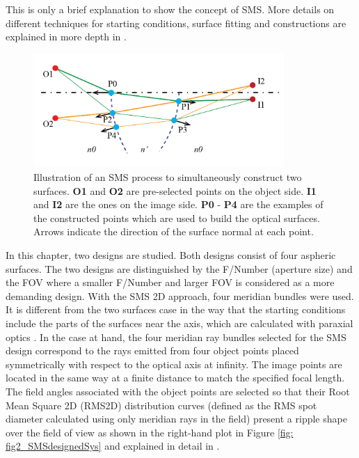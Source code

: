 This is only a brief explanation to show the concept of SMS. More details on different techniques for starting conditions, surface fitting and constructions are explained in more depth in \cite{book:ChavesNonimagingOptics}.

\begin{figure}[h!]
    \centering
    \includegraphics[width=0.85\textwidth]{chapter-5/figures/Figure_sms_explain_2D.png}
    \caption{Illustration of an SMS process to simultaneously construct two surfaces. \textbf{O1} and \textbf{O2} are pre-selected points on the object side. \textbf{I1} and \textbf{I2} are the ones on the image side. \textbf{P0} - \textbf{P4} are the examples of the constructed points which are used to build the optical surfaces. Arrows indicate the direction of the surface normal at each point. }
    \label{fig: sms_2d_explain}
\end{figure}

In this chapter, two designs are studied. Both designs consist of four aspheric surfaces. The two designs are distinguished by the F/Number (aperture size) and the FOV where a smaller F/Number and larger FOV is considered as a more demanding design. With the SMS 2D approach, four meridian bundles were used. It is different from the two surfaces case in the way that the starting conditions include the parts of the surfaces near the axis, which are calculated with paraxial optics \cite{MinanoOE09}. In the case at hand, the four meridian ray bundles selected for the SMS design correspond to the rays emitted from four object points placed symmetrically with respect to the optical axis at infinity. The image points are located in the same way at a finite distance to match the specified focal length. The field angles associated with the object points are selected so that their Root Mean Square 2D (RMS2D) distribution curves (defined as the RMS spot diameter calculated using only meridian rays in the field) present a ripple shape over the field of view as shown in the right-hand plot in Figure \ref{fig: fig2_SMSdesignedSys} and explained in detail in \cite{LinWang12OE}. 

